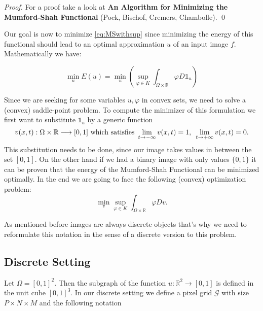     \begin{proof}
        For a proof take a look at \textbf{An Algorithm for Minimizing the Mumford-Shah Functional} (Pock, Bischof, Cremers, Chambolle).
        \qed
    \end{proof}

    Our goal is now to minimize \ref{eq:MSwithsup} since minimizing the energy of this functional should lead to an optimal approximation $u$ of an input image $f$. Mathematically we have:

    \begin{equation}
        \min_{u} E(u) = \min_{u} \left( \sup_{\varphi \in K} \int_{\Omega \times \mathbb{R}} \varphi D\mathds{1}_{u} \right) \label{eq:MINMSwithsup}
    \end{equation}

    Since we are seeking for some variables $u, \varphi$ in convex sets, we need to solve a (convex) saddle-point problem. To compute the minimizer of this formulation we first want to substitute $\mathds{1}_{u}$ by a generic function
        \begin{equation}
            v(x, t): \Omega \times \mathbb{R} \longrightarrow [0, 1] \,\, \textnormal{which satisfies} \,\, \lim_{t \rightarrow -\infty} v(x, t) = 1, \, \, \, \lim_{t \rightarrow +\infty} v(x, t) = 0. \label{eq:limes}
        \end{equation}
    This substitution needs to be done, since our image takes values in between the set $[0, 1]$. On the other hand if we had a binary image with only values $\{0, 1\}$ it can be proven that the energy of the Mumford-Shah Functional can be minimized optimally. In the end we are going to face the following (convex) optimization problem:
        \begin{equation}
            \min_{v} \sup_{\varphi \in K} \int_{\Omega \times \mathbb{R}} \varphi Dv. \label{eq:ContSetting}
        \end{equation}

    As mentioned before images are always discrete objects that's why we need to reformulate this notation in the sense of a discrete version to this problem.

    \subsection{Discrete Setting}

        Let $\Omega = [0, 1]^{2}$. Then the subgraph of the function $u: \mathbb{R}^{2} \longrightarrow [0, 1]$ is defined in the unit cube $[0, 1]^{3}$. In our discrete setting we define a pixel grid $\mathcal{G}$ with size $P \times N \times M$ and the following notation

